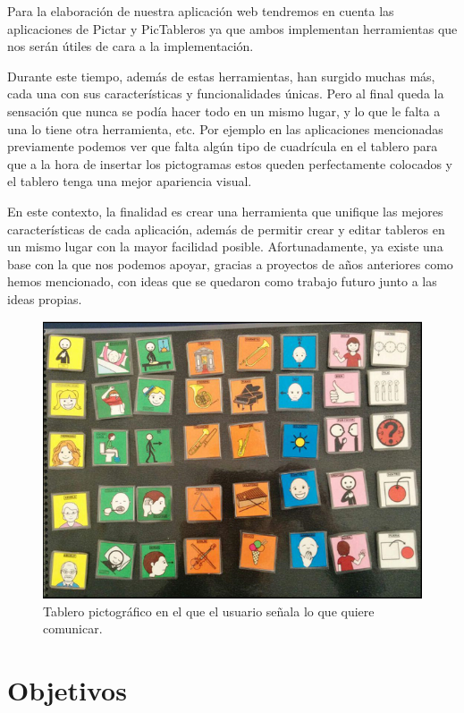 Para la elaboración de nuestra aplicación web tendremos en cuenta las aplicaciones de Pictar y PicTableros ya que ambos implementan herramientas que nos serán útiles de cara a la implementación. 

Durante este tiempo, además de estas herramientas, han surgido muchas más, cada una con sus características y funcionalidades únicas. Pero al final queda la sensación que nunca se podía hacer todo en un mismo lugar, y lo que le falta a una lo tiene otra herramienta, etc. Por ejemplo en las aplicaciones mencionadas previamente podemos ver que falta algún tipo de cuadrícula en el tablero para que a la hora de insertar los pictogramas estos queden perfectamente colocados y el tablero tenga una mejor apariencia visual.

En este contexto, la finalidad es crear una herramienta que unifique las mejores características de cada aplicación, además de permitir crear y editar tableros en un mismo lugar con la mayor facilidad posible. Afortunadamente, ya existe una base con la que nos podemos apoyar, gracias a proyectos de años anteriores como hemos mencionado, con ideas que se quedaron como trabajo futuro junto a las ideas propias. 


\begin{figure}[h!]
	\centering
	\includegraphics[width=0.7\linewidth]{Imagenes/Bitmap/tablerofisico}
	\caption{Tablero pictográfico en el que el usuario señala lo que quiere comunicar.}
	\label{fig:tablerofisico}
\end{figure}






\section{Objetivos}
\label{cap1:sec:Objetivos}

